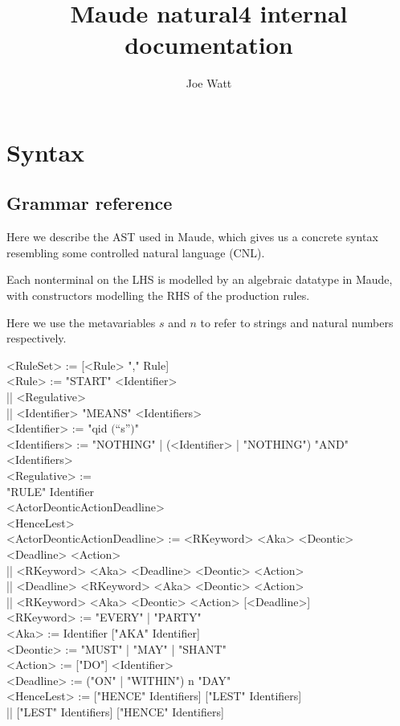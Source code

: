 \documentclass{article}
\title{Maude natural4 internal documentation}
\author{Joe Watt}
\begin{document}
\maketitle


\tableofcontents

\newpage

\section{Syntax}

\subsection{Grammar reference}
Here we describe the AST used in Maude, which gives us a concrete syntax
resembling some controlled natural language (CNL).

Each nonterminal on the LHS is modelled by an algebraic datatype in Maude, with
constructors modelling the RHS of the production rules.

Here we use the metavariables $s$ and $n$ to refer to strings and
natural numbers respectively.

\begin{ebnf}
  <RuleSet> := [{<Rule> ","} Rule] \\
  <Rule> := "START" <Identifier> \\
    || <Regulative> \\
    || <Identifier> "MEANS" <Identifiers>
  \\
  <Identifier> := "qid $\lparen$``s''$\rparen$"
  \\
  <Identifiers> := "NOTHING" | {(<Identifier> | "NOTHING") "AND"} <Identifiers>
  \\
  <Regulative> := \\
    "RULE" Identifier \\
    <ActorDeonticActionDeadline> \\
    <HenceLest>
  \\
  <ActorDeonticActionDeadline> :=
    <RKeyword> <Aka> <Deontic> <Deadline> <Action> \\
    || <RKeyword> <Aka> <Deadline> <Deontic> <Action> \\
    || <Deadline> <RKeyword> <Aka> <Deontic> <Action> \\
    || <RKeyword> <Aka> <Deontic> <Action> [<Deadline>]
  \\
  <RKeyword> := "EVERY" | "PARTY"
  \\
  <Aka> := Identifier ["AKA" Identifier]
  \\
  <Deontic> := "MUST" | "MAY" | "SHANT"
  \\
  <Action> := ["DO"] <Identifier>
  \\
  <Deadline> := ("ON" | "WITHIN") n "DAY"
  \\
  <HenceLest> := ["HENCE" Identifiers] ["LEST" Identifiers] \\
    || ["LEST" Identifiers] ["HENCE" Identifiers]
\end{ebnf}
\end{document}
